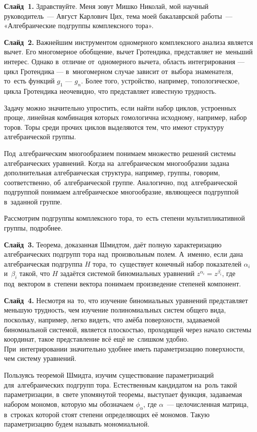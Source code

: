\documentclass{article}
\begin{document}
  \textbf{Слайд~1.} Здравствуйте. Меня зовут Мишко Николай, мой научный руководитель~— Август Карлович Цих,
  тема моей бакалаврской работы~— «Алгебраические подгруппы комплексного тора».

  \textbf{Слайд~2.} Важнейшим инструментом одномерного комплексного анализа является вычет.
  Его многомерное обобщение, вычет Гротендика, представляет не~меньший интерес.
  Однако в~отличие от~одномерного вычета, область интегрирования — цикл Гротендика — в~многомерном случае зависит от~выбора знаменателя,
  то~есть функций $g_1$ — $g_n$. Более того, устройство, например, топологическое, цикла Гротендика неочевидно, что представляет
  известную трудность.

  Задачу можно значительно упростить, если найти набор циклов, устроенных проще, линейная комбинация которых гомологична исходному,
  например, набор торов. Торы среди прочих циклов выделяются тем, что имеют структуру алгебраической группы.

  Под~алгебраическим многообразием понимаем множество решений системы алгебраических уравнений.
  Когда на~алгебраическом многообразии задана дополнительная алгебраическая структура, например, группы,
  говорим, соответственно, об~алгебраической группе.
  Аналогично, под~алгебраической подгруппой понимаем алгебраическое многообразие, являющееся подгруппой в~заданной группе.

  Рассмотрим подгруппы комплексного тора, то~есть степени мультипликативной группы, подробнее.

  \textbf{Слайд~3.} Теорема, доказанная Шмидтом, даёт полную характеризацию алгебраических подгрупп тора
  над~произвольным полем. А~именно, если дана алгебраическая подгруппа $H$ тора, то~существует конечный набор
  показателей $\alpha_i$ и~$\beta_i$ такой, что $H$ задаётся системой биномиальных уравнений $z^{\alpha_i} = z^{\beta_i}$,
  где под~вектором в~степени вектора понимаем произведение степеней компонент.

  \textbf{Слайд~4.} Несмотря на~то, что изучение биномиальных уравнений представляет
  меньшую трудность, чем изучение полиномиальных систем общего вида, поскольку, например,
  легко видеть, что амёба поверхности, задаваемой биномиальной системой, является плоскостью,
  проходящей через начало системы координат, такое представление всё ещё не~слишком удобно.
  При~интегрировании значительно удобнее иметь параметризацию поверхности, чем систему уравнений.

  Пользуясь теоремой Шмидта, изучим существование параметризаций для~алгебраических подгрупп тора.
  Естественным кандидатом на~роль такой параметризации, в~свете упомянутой теоремы, выступает функция,
  задаваемая набором мономов, которую мы обозначаем $\phi_\alpha$, где $\alpha$~— целочисленная матрица,
  в~строках которой стоят степени определяющих её мономов. Такую параметризацию будем называть мономиальной.
\end{document}
